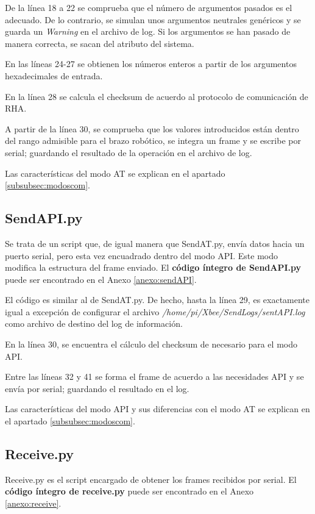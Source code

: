De la línea 18 a 22 se comprueba que el número de argumentos pasados es el adecuado. De lo contrario, se simulan unos argumentos neutrales genéricos y se guarda un \textit{Warning} en el archivo de log. Si los argumentos se han pasado de manera correcta, se sacan del atributo del sistema.

En las líneas 24-27 se obtienen los números enteros a partir de los argumentos hexadecimales de entrada.

En la línea 28 se calcula el checksum de acuerdo al protocolo de comunicación de RHA.

A partir de la línea 30, se comprueba que los valores introducidos están dentro del rango admisible para el brazo robótico, se integra un frame y se escribe por serial; guardando el resultado de la operación en el archivo de log.

Las características del modo AT se explican en el apartado \ref{subsubsec:modoscom}.

\subsection{SendAPI.py}\label{subsubsec:sendapi}

Se trata de un script que, de igual manera que SendAT.py, envía datos hacia un puerto serial, pero esta vez encuadrado dentro del modo API. Este modo modifica la estructura del frame enviado. El \textbf{código íntegro de SendAPI.py} puede ser encontrado en el Anexo \ref{anexo:sendAPI}.

El código es similar al de SendAT.py. De hecho, hasta la línea 29, es exactamente igual a excepción de configurar el archivo \textit{/home/pi/Xbee/SendLogs/sentAPI.log} como archivo de destino del log de información.

En la línea 30, se encuentra el cálculo del checksum de necesario para el modo API.

Entre las líneas 32 y 41 se forma el frame de acuerdo a las necesidades API y se envía por serial; guardando el resultado en el log.

Las características del modo API y sus diferencias con el modo AT se explican en el apartado \ref{subsubsec:modoscom}.

\subsection{Receive.py}\label{subsubsec:receive}

Receive.py es el script encargado de obtener los frames recibidos por serial. El \textbf{código íntegro de receive.py} puede ser encontrado en el Anexo \ref{anexo:receive}.

